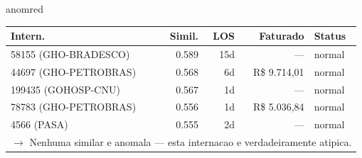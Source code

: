 \documentclass[a4paper,10pt]{article}
\begin{document}
\begin{anomalycard}[Internacao 116 | GHO-POSTAL | CRITICO (z=5.11)]{anomred}
\begin{tabular}{l r r r l}\toprule\textbf{Intern.} & \textbf{Simil.} & \textbf{LOS} & \textbf{Faturado} & \textbf{Status} \\\midrule
58155 (GHO-BRADESCO) & 0.589 & 15d & --- & \textcolor{jcubeblue}{normal} \\
44697 (GHO-PETROBRAS) & 0.568 & 6d & R\$ 9.714,01 & \textcolor{jcubeblue}{normal} \\
199435 (GOHOSP-CNU) & 0.567 & 1d & --- & \textcolor{jcubeblue}{normal} \\
78783 (GHO-PETROBRAS) & 0.556 & 1d & R\$ 5.036,84 & \textcolor{jcubeblue}{normal} \\
4566 (PASA) & 0.555 & 2d & --- & \textcolor{jcubeblue}{normal} \\
\multicolumn{5}{l}{\textcolor{jcubeblue}{\small $\rightarrow$ Nenhuma similar e anomala --- esta internacao e verdadeiramente atipica.}} \\
\bottomrule\end{tabular}


\end{anomalycard}

\newpage
\end{document}
